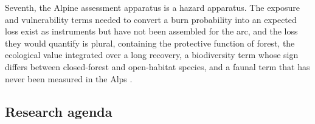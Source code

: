 \documentclass[11pt,a4paper]{article}
\begin{document}
Seventh, the Alpine assessment apparatus is a hazard apparatus. The exposure and vulnerability terms needed to convert a burn probability into an expected loss exist as instruments but have not been assembled for the arc, and the loss they would quantify is plural, containing the protective function of forest, the ecological value integrated over a long recovery, a biodiversity term whose sign differs between closed-forest and open-habitat species, and a faunal term that has never been measured in the Alps \citep{papathomakohle_towards_2025, arrogantefunes_mapping_2024, rey_effects_2019, demiguel_fires_2021}.

\subsection{Research agenda}
\end{document}
